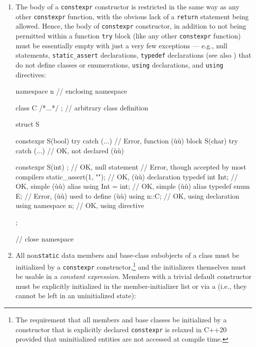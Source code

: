 \begin{enumerate}
\item{The body of a \lstinline!constexpr! constructor is restricted in the same way as any other \lstinline!constexpr! function, with the obvious lack of a \lstinline!return! statement being allowed. Hence, the body of \lstinline!constexpr! constructor, in addition to not being permitted within a function \lstinline!try! block (like any other \lstinline!constexpr! function) must be essentially empty with just a very few exceptions — e.g., null statements, \lstinline!static_assert! declarations, \lstinline!typedef! declarations (see also ) that do not define classes or enumerations, \lstinline!using! declarations, and \lstinline!using! directives:

\begin{emcppslisting}
namespace n           // enclosing namespace
{

class C { /*...*/ };  // arbitrary class definition

struct S
{
    constexpr S(bool) try { } catch (...) { }  // Error, function (ù{}ù) block
              S(char) try { } catch (...) { }  // OK, not declared (ù{}ù)

    constexpr S(int)
    {
        ;                      // OK, null statement
        {}                     // Error, though accepted by most compilers
        static_assert(1, "");  // OK, (ù{}ù) declaration
        typedef int Int;       // OK, simple (ù{}ù) alias
        using Int = int;       // OK, simple (ù{}ù) alias
        typedef enum {} E;     // Error, (ù{}ù) used to define (ù{}ù)
        using n::C;            // OK, using declaration
        using namespace n;     // OK, using directive
    }
};

}  // close namespace
\end{emcppslisting}
}

\item{All non\lstinline!static! data members and base-class subobjects of a class must be initialized by a \lstinline!constexpr! constructor,\cprotect\footnote{The requirement that all members and base classes be initialized by a constructor that is explicitly declared \lstinline!constexpr! is relaxed in C++20 provided that uninitialized entities are not accessed at compile time.} and the initializers themselves must be usable in a \emph{constant expression}. Members with a trivial default constructor must be explicitly initialized in the member-initializer list or via a  (i.e., they cannot be left in an uninitialized state):

}
\end{enumerate}
